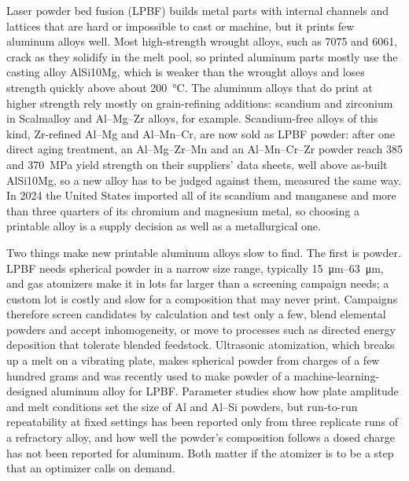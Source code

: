 \documentclass[11pt]{article}
\begin{document}
Laser powder bed fusion (LPBF) builds metal parts with internal channels and
lattices that are hard or impossible to cast or machine, but it prints few
aluminum alloys well.\cite{aboulkhair2019,kotadia2021} Most high-strength wrought alloys, such
as 7075 and 6061, crack as they solidify in the melt pool,\cite{martin2017,kou2015}
so printed aluminum parts mostly use the casting alloy AlSi10Mg, which is weaker
than the wrought alloys and loses strength quickly above about
\SI{200}{\celsius}.\cite{aboulkhair2019,michi2022} The aluminum alloys that do
print at higher strength rely mostly on grain-refining additions: scandium and
zirconium in Scalmalloy and Al--Mg--Zr alloys, for
example.\cite{schmidtke2011,spierings2017,croteau2018,martin2017} Scandium-free
alloys of this kind, Zr-refined Al--Mg and Al--Mn--Cr,\cite{croteau2018,almncrzr2024}
are now sold as LPBF powder: after one direct aging treatment, an
Al--Mg--Zr--Mn and an Al--Mn--Cr--Zr powder reach 385 and
\SI{370}{\mega\pascal} yield strength on their suppliers' data
sheets,\cite{ds_al5x1,ds_hoganas} well above as-built AlSi10Mg, so a new alloy
has to be judged against them, measured the same way. In 2024 the
United States imported all of its scandium and manganese and more than three
quarters of its chromium and magnesium metal,\cite{usgs2025,nassar2020} so
choosing a printable alloy is a supply decision as well as a metallurgical
one.\cite{graedel2012,nassar2021ofr,bauer2023}

Two things make new printable aluminum alloys slow to find. The first is
powder. LPBF needs spherical powder in a narrow size range, typically
\SIrange{15}{63}{\micro\metre}, and gas atomizers make it in lots far larger
than a screening campaign needs;\cite{dawes2015} 
a custom lot is costly and slow for a composition that may never print.
Campaigns therefore screen candidates by calculation and test only a few, blend
elemental powders and accept inhomogeneity, or move to processes such as
directed energy deposition that tolerate blended feedstock.\cite{nelaturu2024}
Ultrasonic atomization, which breaks up a melt on a vibrating plate, makes
spherical powder from charges of a few hundred grams\cite{rePowder2021,priyadarshi2024}
and was recently used to make powder of a machine-learning-designed aluminum
alloy for LPBF.\cite{taherimousavi2026} Parameter studies show how plate
amplitude and melt conditions set the size of Al and Al--Si powders,\cite{priyadarshi2024,yankin2025}
but run-to-run repeatability at fixed settings has been reported only from three
replicate runs of a refractory alloy,\cite{hinrichs2021} and how well the
powder's composition follows a dosed charge has not been reported for
aluminum. Both matter if
the atomizer is to be a step that an optimizer calls on demand.
\end{document}
